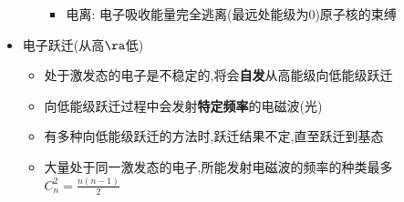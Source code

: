 \documentclass{article}
\begin{document}
\begin{itemize}
\begin{itemize}
\begin{minipage}{0.52\textwidth}
\begin{itemize}
\begin{itemize}
                                \end{itemize}
                          \item 电离: 电子吸收能量完全逃离(最远处能级为$0$)原子核的束缚
                      \end{itemize}
                  \end{minipage}
          \end{itemize}
    \item 电子跃迁(从高$\ra$低)
          \begin{itemize}
              \item 处于激发态的电子是不稳定的,将会\textbf{自发}从高能级向低能级跃迁
              \item 向低能级跃迁过程中会发射\textbf{特定频率}的电磁波(光)
              \item 有多种向低能级跃迁的方法时,跃迁结果不定,直至跃迁到基态
              \item 大量处于同一激发态的电子,所能发射电磁波的频率的种类最多$C_{n}^{2} = \frac{n(n-1)}{2}$
          \end{itemize}
\end{itemize}

\vspace{2em}
\end{document}
